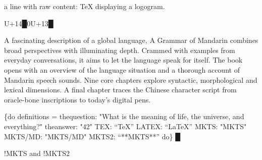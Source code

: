 
a line with raw content: \TeX{} displaying a logogram.\mktsShowpar\par
{\mktsStyleBold\color{red}{%
\mktsStyleSymbol█}U+14{\mktsStyleSymbol█}}0{\mktsStyleBold\color{red}{%
\mktsStyleSymbol█}U+13{\mktsStyleSymbol█}}\mktsShowpar\par
A fascinating description of a global language, {\mktsStyleItalic{}A Grammar of Mandarin\/} combines broad perspectives with illuminating depth. Crammed with examples from everyday conversations, it aims to let the language speak for itself. The book opens with an overview of the language situation and a thorough account of Mandarin speech sounds. Nine core chapters explore syntactic, morphological and lexical dimensions. A final chapter traces the Chinese character script from oracle-bone inscriptions to today’s digital pens.\mktsShowpar\par
{\mktsStyleBold\color{violet}{%
\mktsStyleSymbol█}\{do {\mktsStyleSymbol}}
definitions =
  thequestion:    "{\mktsStyleItalic{}What is the meaning of life, the universe, and everything?\/}"
  theanswer:      "{\mktsStyleBold{}42}"
  TEX:            “\TeX{}”
  LATEX:          “\LaTeX{}”
  MKTS:           "{\mktsStyleBold{}MKTS}"
  MKTS/MD:        "{\mktsStyleBold{}MKTS/MD}"
  MKTS2:          “**MKTS**”
{\mktsStyleBold\color{violet}{%
\mktsStyleSymbol}do\} {\mktsStyleSymbol█}}\mktsShowpar\par
{\mktsStyleBold\color{violet}{%
\mktsStyleSymbol█}!MKTS {\mktsStyleSymbol}} and {\mktsStyleBold\color{violet}{%
\mktsStyleSymbol█}!MKTS2 {\mktsStyleSymbol}}

